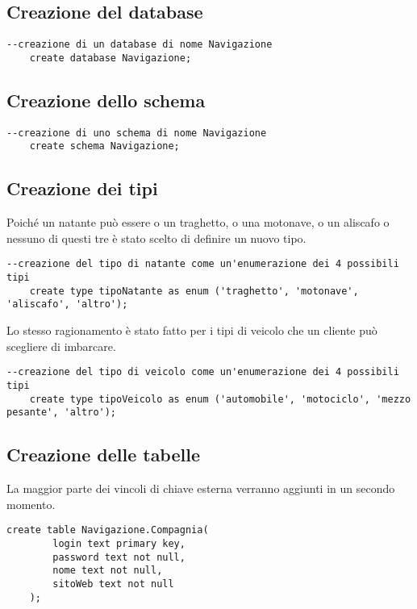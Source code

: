 \subsection{Creazione del database}
\begin{lstlisting}[style=sqlstyle, title = {Creazione del database}]
    --creazione di un database di nome Navigazione
    create database Navigazione;
\end{lstlisting}

\subsection{Creazione dello schema}
\begin{lstlisting}[style=sqlstyle, title = {Creazione dello schema}]
    --creazione di uno schema di nome Navigazione
    create schema Navigazione;
\end{lstlisting}

\subsection{Creazione dei tipi}
Poiché un natante può essere o un traghetto, o una motonave, o un aliscafo o nessuno di questi tre è stato scelto di definire un nuovo tipo.
\begin{lstlisting}[style=sqlstyle, title = {Creazione del tipo tipoNatante}]
    --creazione del tipo di natante come un'enumerazione dei 4 possibili tipi
    create type tipoNatante as enum ('traghetto', 'motonave', 'aliscafo', 'altro');
\end{lstlisting}

Lo stesso ragionamento è stato fatto per i tipi di veicolo che un cliente può scegliere di imbarcare.
\begin{lstlisting}[style=sqlstyle, title = {Creazione del tipo tipoVeicolo}]
    --creazione del tipo di veicolo come un'enumerazione dei 4 possibili tipi
    create type tipoVeicolo as enum ('automobile', 'motociclo', 'mezzo pesante', 'altro');
\end{lstlisting}

\subsection{Creazione delle tabelle}
La maggior parte dei vincoli di chiave esterna verranno aggiunti in un secondo momento.
\begin{lstlisting}[style=sqlstyle, title = {Creazione della tabella Compagnia}]
    create table Navigazione.Compagnia(
        login text primary key,
        password text not null,
        nome text not null,
        sitoWeb text not null
    );
\end{lstlisting}

